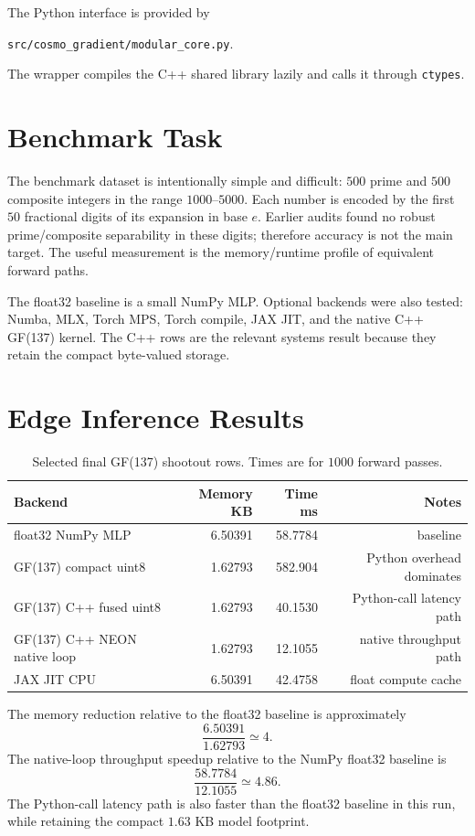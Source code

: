 \documentclass[11pt]{article}
\begin{document}
The Python interface is provided by
\begin{center}
\texttt{src/cosmo\_gradient/modular\_core.py}.
\end{center}
The wrapper compiles the C++ shared library lazily and calls it through
\texttt{ctypes}.

\section{Benchmark Task}

The benchmark dataset is intentionally simple and difficult: $500$ prime and
$500$ composite integers in the range $1000$--$5000$.  Each number is encoded
by the first $50$ fractional digits of its expansion in base $e$.  Earlier
audits found no robust prime/composite separability in these digits; therefore
accuracy is not the main target.  The useful measurement is the memory/runtime
profile of equivalent forward paths.

The float32 baseline is a small NumPy MLP.  Optional backends were also tested:
Numba, MLX, Torch MPS, Torch compile, JAX JIT, and the native C++ GF(137)
kernel.  The C++ rows are the relevant systems result because they retain the
compact byte-valued storage.

\section{Edge Inference Results}

\begin{table}[h]
\centering
\caption{Selected final GF(137) shootout rows.  Times are for $1000$ forward
passes.}
\begin{tabular}{lrrr}
\toprule
Backend & Memory KB & Time ms & Notes \\
\midrule
float32 NumPy MLP & 6.50391 & 58.7784 & baseline \\
GF(137) compact uint8 & 1.62793 & 582.904 & Python overhead dominates \\
GF(137) C++ fused uint8 & 1.62793 & 40.1530 & Python-call latency path \\
GF(137) C++ NEON native loop & 1.62793 & 12.1055 & native throughput path \\
JAX JIT CPU & 6.50391 & 42.4758 & float compute cache \\
\bottomrule
\end{tabular}
\end{table}

The memory reduction relative to the float32 baseline is approximately
\begin{equation}
    \frac{6.50391}{1.62793}\simeq4.
\end{equation}
The native-loop throughput speedup relative to the NumPy float32 baseline is
\begin{equation}
    \frac{58.7784}{12.1055}\simeq4.86.
\end{equation}
The Python-call latency path is also faster than the float32 baseline in this
run, while retaining the compact $1.63$ KB model footprint.
\end{document}
